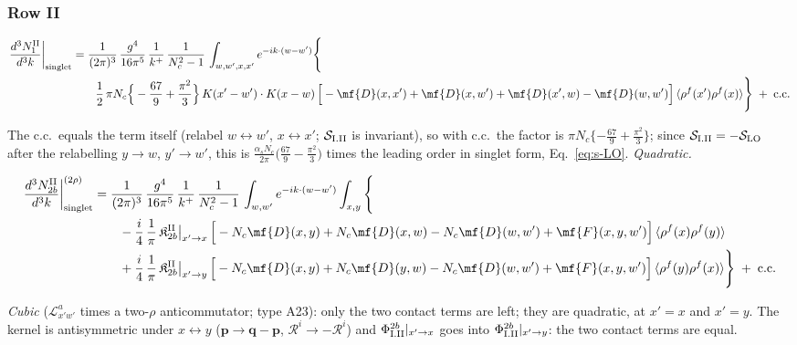 {\subsubsection*{Row II}

\begin{align}
\frac{d^{3}N_{1}^{\rm II}}{d^{3}k}\bigg|_{\rm singlet}&=\frac{1}{(2\pi)^{3}}\,\frac{g^{4}}{16\pi^{5}}\,\frac{1}{k^{+}}\,\frac{1}{N_{c}^{2}-1}\,\int_{w,w',x,x'}e^{-ik\cdot(w-w')}\Bigg\{\notag\\
&\qquad \frac{1}{2}\,\pi N_{c}\Big\{-\frac{67}{9}+\frac{\pi^{2}}{3}\Big\}\,K(x'-w')\cdot K(x-w)\,\Big[-\mf{D}(x,x')+\mf{D}(x,w')+\mf{D}(x',w)-\mf{D}(w,w')\Big]\,\langle\rho^{f}(x')\rho^{f}(x)\rangle\Bigg\}\;+\;{\rm c.c.}\label{eq:s-I-II-1}
\end{align}

The c.c.\ equals the term itself (relabel $w\leftrightarrow w'$, $x\leftrightarrow x'$; $\mathcal{S}_{\rm I.II}$ is invariant), so with c.c.\ the factor is $\pi N_{c}\{-\frac{67}{9}+\frac{\pi^{2}}{3}\}$; since $\mathcal{S}_{\rm I.II}=-\mathcal{S}_{\rm LO}$ after the relabelling $y\to w$, $y'\to w'$, this is $\frac{\alpha_{s}N_{c}}{2\pi}\big(\frac{67}{9}-\frac{\pi^{2}}{3}\big)$ times the leading order in singlet form, Eq.~\eqref{eq:s-LO}. \emph{Quadratic.}

\begin{align}
\frac{d^{3}N_{2b}^{\rm II}}{d^{3}k}\bigg|^{(2\rho)}_{\rm singlet}&=\frac{1}{(2\pi)^{3}}\,\frac{g^{4}}{16\pi^{5}}\,\frac{1}{k^{+}}\,\frac{1}{N_{c}^{2}-1}\,\int_{w,w'}e^{-ik\cdot(w-w')}\int_{x,y}\Bigg\{\notag\\
&\qquad -\frac{i}{4}\,\frac{1}{\pi}\,\mathfrak{K}^{\rm II}_{2b}\big|_{x'\to x}\,\Big[-N_{c}\mf{D}(x,y)+N_{c}\mf{D}(x,w)-N_{c}\mf{D}(w,w')+\mf{F}(x,y,w')\Big]\,\langle\rho^{f}(x)\rho^{f}(y)\rangle\notag\\
&\qquad +\frac{i}{4}\,\frac{1}{\pi}\,\mathfrak{K}^{\rm II}_{2b}\big|_{x'\to y}\,\Big[-N_{c}\mf{D}(x,y)+N_{c}\mf{D}(y,w)-N_{c}\mf{D}(w,w')+\mf{F}(x,y,w')\Big]\,\langle\rho^{f}(y)\rho^{f}(x)\rangle\Bigg\}\;+\;{\rm c.c.}\label{eq:s-I-II-2b}
\end{align}

\emph{Cubic} ($\mathcal{L}^{a}_{x'w'}$ times a two-$\rho$ anticommutator; type A23): only the two contact terms are left; they are quadratic, at $x'=x$ and $x'=y$. The kernel is antisymmetric under $x\leftrightarrow y$ ($\mathbf{p}\to\mathbf{q}-\mathbf{p}$, $\mathcal{R}^{i}\to-\mathcal{R}^{i}$) and $\Phi^{2b}_{\rm I.II}|_{x'\to x}$ goes into $\Phi^{2b}_{\rm I.II}|_{x'\to y}$: the two contact terms are equal.

}
